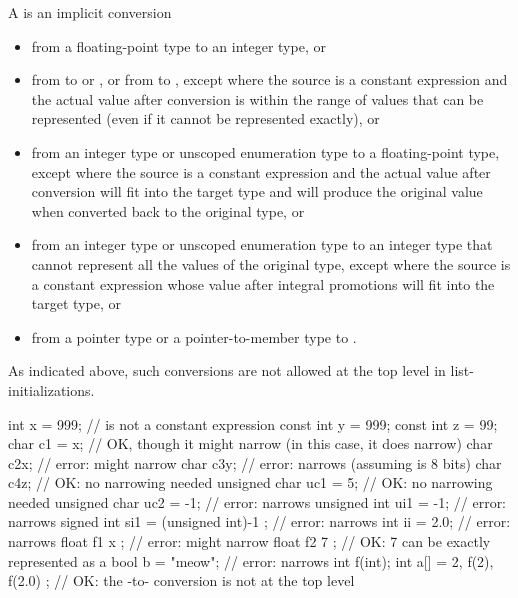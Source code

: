 \pnum
A  is an implicit conversion
\begin{itemize}
\item from a floating-point type to an integer type, or

\item from  to  or , or from
 to , except where the source is a constant expression and
the actual value after conversion
is within the range of values that can be represented (even if it cannot be represented exactly),
or

\item from an integer type or unscoped enumeration type to a floating-point type, except
where the source is a constant expression and the actual value after conversion will fit
into the target type and will produce the original value when converted back to the
original type, or

\item from an integer type or unscoped enumeration type to an integer type that cannot
represent all the values of the original type, except where the source is a constant
expression whose value after integral promotions will fit into the target type, or

\item from a pointer type or a pointer-to-member type to .
\end{itemize}

\begin{note}
As indicated above, such conversions are not allowed at the top level in
list-initializations.
\end{note}
\begin{example}
\begin{codeblock}
int x = 999;                    //  is not a constant expression
const int y = 999;
const int z = 99;
char c1 = x;                    // OK, though it might narrow (in this case, it does narrow)
char c2{x};                     // error: might narrow
char c3{y};                     // error: narrows (assuming  is 8 bits)
char c4{z};                     // OK: no narrowing needed
unsigned char uc1 = {5};        // OK: no narrowing needed
unsigned char uc2 = {-1};       // error: narrows
unsigned int ui1 = {-1};        // error: narrows
signed int si1 =
  { (unsigned int)-1 };         // error: narrows
int ii = {2.0};                 // error: narrows
float f1 { x };                 // error: might narrow
float f2 { 7 };                 // OK: 7 can be exactly represented as a 
bool b = {"meow"};              // error: narrows
int f(int);
int a[] = { 2, f(2), f(2.0) };  // OK: the -to- conversion is not at the top level
\end{codeblock}
\end{example}
%
%

